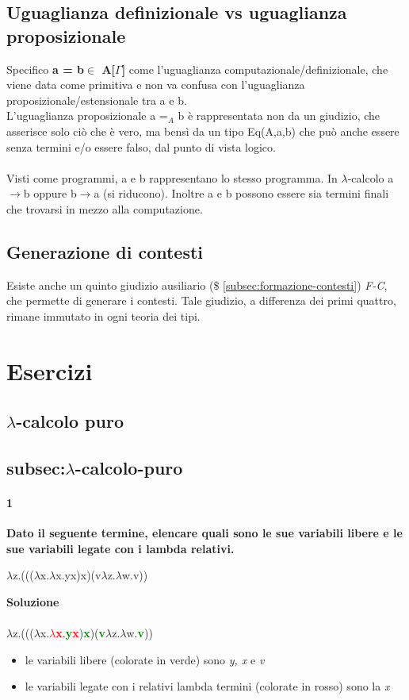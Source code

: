 \subsection{Uguaglianza definizionale vs uguaglianza proposizionale}
\label{subsec:uguaglianza-computazionale-proposizionale}
Specifico \textbf{a = b$\in$ A[$\Gamma$]} come l'uguaglianza computazionale/definizionale, che viene data come primitiva e non va confusa con l'uguaglianza proposizionale/estensionale tra a e b.\\L'uguaglianza proposizionale a =$_A$ b \`e rappresentata non da un giudizio, che asserisce solo ci\`o che \`e vero, ma bens\`i da un tipo Eq(A,a,b) che pu\`o anche essere senza termini e/o essere falso, dal punto di vista logico.\\\\
Visti come programmi, a e b rappresentano lo stesso programma. In $\lambda$-calcolo a$\rightarrow$b oppure b$\rightarrow$a (si riducono). Inoltre a e b possono essere sia termini finali che trovarsi in mezzo alla computazione.
\subsection{Generazione di contesti}
\label{subsec:generazione-di-contesti}
Esiste anche un quinto giudizio ausiliario (\$ \ref{subsec:formazione-contesti}) \textit{F-C}, che permette di generare i contesti. Tale giudizio, a differenza dei primi quattro, rimane immutato in ogni teoria dei tipi.

\section{Esercizi}
\subsection{$\lambda$-calcolo puro}
\subsection{subsec:$\lambda$-calcolo-puro}
\paragraph{1} 
\textbf{Dato il seguente termine, elencare quali sono le sue variabili libere e le sue variabili legate con i lambda relativi.}
\begin{center}$\lambda$z.((($\lambda$x.$\lambda$x.yx)x)(v$\lambda$z.$\lambda$w.v))\end{center}
\textbf{Soluzione}\\\\
$\lambda$z.((($\lambda$x.\textbf{\textcolor{red}{$\lambda$x}}.\textbf{\textcolor{green}{y}\textcolor{red}{x}})\textbf{\textcolor{green}{x}})(\textbf{\textcolor{green}{v}}$\lambda$z.$\lambda$w.\textbf{\textcolor{green}{v}}))
\begin{itemize}
\item le variabili libere (colorate in verde) sono \textit{y, x} e \textit{v}
\item le variabili legate con i relativi lambda termini (colorate in rosso) sono la \textit{x}
\end{itemize}

